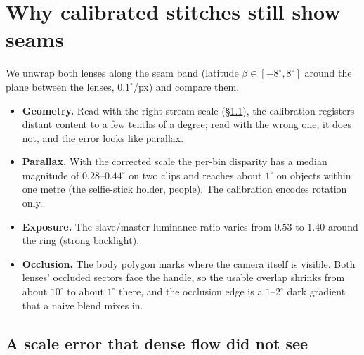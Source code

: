 \documentclass[11pt]{article}
\begin{document}
\section{Why calibrated stitches still show seams}\label{sec:why}

We unwrap both lenses along the seam band (latitude $\beta\in[-8^\circ,8^\circ]$ around the plane between the lenses, $0.1^\circ$/px) and compare them.

\begin{itemize}
\item \textbf{Geometry.} Read with the right stream scale (\S\ref{sec:scale}), the calibration registers distant content to a few tenths of a degree; read with the wrong one, it does not, and the error looks like parallax.
\item \textbf{Parallax.} With the corrected scale the per-bin disparity has a median magnitude of $0.28$--$0.44^\circ$ on two clips and reaches about $1^\circ$ on objects within one metre (the selfie-stick holder, people). The calibration encodes rotation only.
\item \textbf{Exposure.} The slave/master luminance ratio varies from $0.53$ to $1.40$ around the ring (strong backlight).
\item \textbf{Occlusion.} The body polygon marks where the camera itself is visible. Both lenses' occluded sectors face the handle, so the usable overlap shrinks from about $10^\circ$ to about $1^\circ$ there, and the occlusion edge is a $1$--$2^\circ$ dark gradient that a naive blend mixes in.
\end{itemize}

\subsection{A scale error that dense flow did not see}\label{sec:scale}
\end{document}
